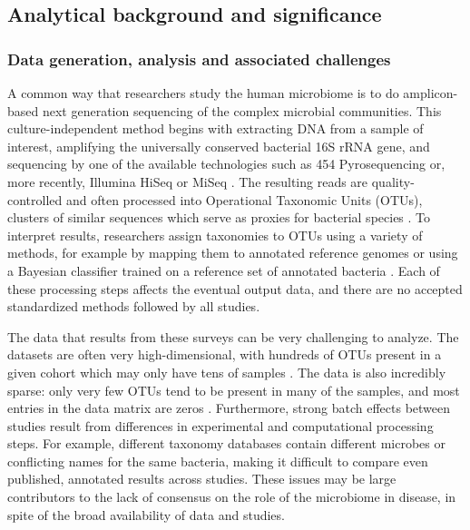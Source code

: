 \documentclass[12pt]{article}
\begin{document}
\subsection{Analytical background and significance}

\subsubsection{Data generation, analysis and associated challenges} 
A common way that researchers study the human microbiome is to do 
amplicon-based next generation sequencing of the complex microbial 
communities. This culture-independent method begins with extracting
DNA from a sample of interest, amplifying the universally conserved
bacterial 16S rRNA gene, and sequencing by one of the available technologies such as 454 
Pyrosequencing or, more recently, Illumina HiSeq or MiSeq \cite{knights-supervised-2010, sze-signal-2016}. 
The resulting reads are quality-controlled and often processed into Operational Taxonomic Units (OTUs), 
clusters of similar sequences which serve as proxies for bacterial 
species \cite{knights-supervised-2010}. To interpret results, researchers assign taxonomies to 
OTUs using a variety of methods, for example by mapping them to 
annotated reference genomes or using a Bayesian classifier trained on 
a reference set of annotated bacteria \cite{wang-rdp-2007, mcdonald-gg-2011}. Each of 
these processing steps affects the eventual output data, and there
are no accepted standardized methods followed by all studies.

The data that results from these surveys can be very challenging to analyze.
The datasets are often very high-dimensional, with hundreds 
of OTUs present in a given cohort which may only have tens of samples \cite{sze-signal-2016}. 
The data is also incredibly sparse: only very few OTUs tend to be 
present in many of the samples, and most entries in the data matrix 
are zeros \cite{knights-biomarkers-2011}. 
Furthermore, strong batch effects between studies result from 
differences in experimental and computational processing steps.
For example, different taxonomy databases contain different 
microbes or conflicting names for the same bacteria, making it 
difficult to compare even published, annotated results across studies.  
These issues may be large contributors to the lack of consensus on the 
role of the microbiome in disease, in spite of the broad availability of data and studies.
\end{document}
